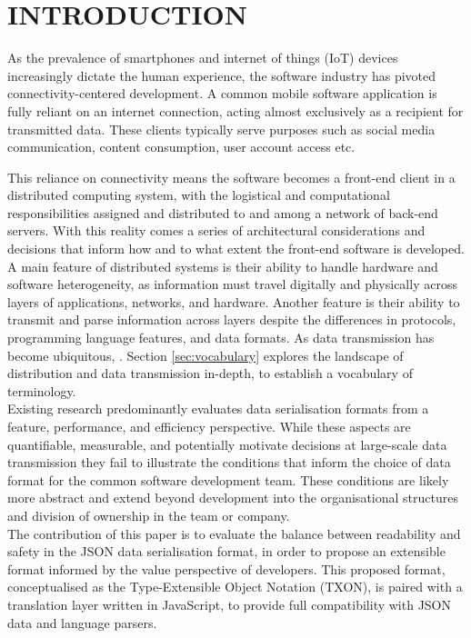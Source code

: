 \documentclass[../report.tex]{subfiles}
\begin{document}
\section{INTRODUCTION}

As the prevalence of smartphones and internet of things (IoT) devices increasingly dictate the human experience, the software industry has pivoted connectivity-centered development. A common mobile software application is fully reliant on an internet connection, acting almost exclusively as a recipient for transmitted data. These clients typically serve purposes such as social media communication, content consumption, user account access etc.

This reliance on connectivity means the software becomes a front-end client in a distributed computing system, with the logistical and computational responsibilities assigned and distributed to and among a network of back-end servers. With this reality comes a series of architectural considerations and decisions that inform how and to what extent the front-end software is developed. \\

A main feature of distributed systems is their ability to handle hardware and software heterogeneity, as information must travel digitally and physically across layers of applications, networks, and hardware. Another feature is their ability to transmit and parse information across layers despite the differences in protocols, programming language features, and data formats. As data transmission has become ubiquitous, . Section \ref{sec:vocabulary} explores the landscape of distribution and data transmission in-depth, to establish a vocabulary of terminology. \\

Existing research predominantly evaluates data serialisation formats from a feature, performance, and efficiency perspective. While these aspects are quantifiable, measurable, and potentially motivate decisions at large-scale data transmission they fail to illustrate the conditions that inform the choice of data format for the common software development team. These conditions are likely more abstract and extend beyond development into the organisational structures and division of ownership in the team or company. \\

The contribution of this paper is to evaluate the balance between readability and safety in the JSON data serialisation format, in order to propose an extensible format informed by the value perspective of developers. This proposed format, conceptualised as the Type-Extensible Object Notation (TXON), is paired with a translation layer written in JavaScript, to provide full compatibility with JSON data and language parsers.
\end{document}
